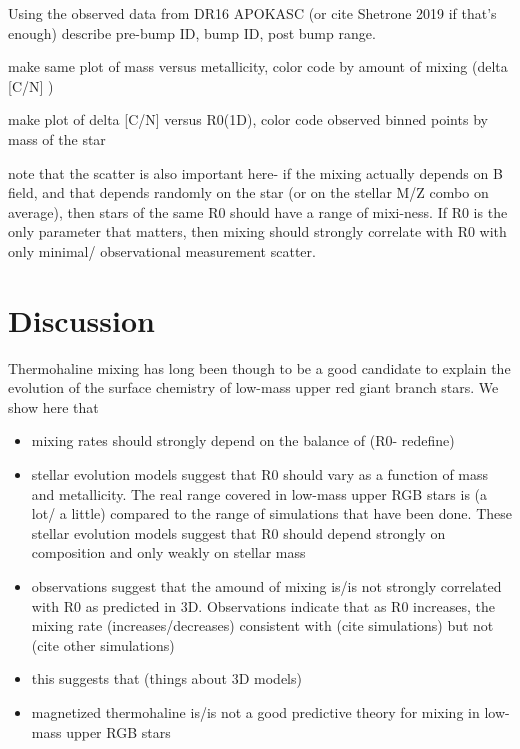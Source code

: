 \documentclass[linenumbers,twocolumn]{aastex62}
\begin{document}
Using the observed data from DR16 APOKASC (or cite Shetrone 2019 if that's enough) describe pre-bump ID, bump ID, post bump range. 

make same plot of mass versus metallicity, color code by amount of mixing (delta [C/N] ) 

make plot of delta [C/N] versus R0(1D), color code observed binned points by mass of the star

note that the scatter is also important here- if the mixing actually depends on B field, and that depends randomly on the star (or on the stellar M/Z combo on average), then stars of the same R0 should have a range of mixi-ness. If R0 is the only parameter that matters, then mixing should strongly correlate with R0 with only minimal/ observational measurement scatter. 

\section{Discussion}

Thermohaline mixing has long been though to be a good candidate to explain the evolution of the surface chemistry of low-mass upper red giant branch stars. We show here that

\begin{itemize}
    \item mixing rates should strongly depend on the balance of (R0- redefine)
    
    \item stellar evolution models suggest that R0 should vary as a function of mass and metallicity. The real range covered in low-mass upper RGB stars is (a lot/ a little) compared to the range of simulations that have been done. These stellar evolution models suggest that R0 should depend strongly on composition and only weakly on stellar mass
    
    \item observations suggest that the amound of mixing is/is not strongly correlated with R0 as predicted in 3D. Observations indicate that as R0 increases, the mixing rate (increases/decreases) consistent with (cite simulations) but not (cite other simulations)
    
    \item this suggests that (things about 3D models)
    
    \item magnetized thermohaline is/is not a good predictive theory for mixing in low-mass upper RGB stars
\end{itemize}
    
\end{document}
